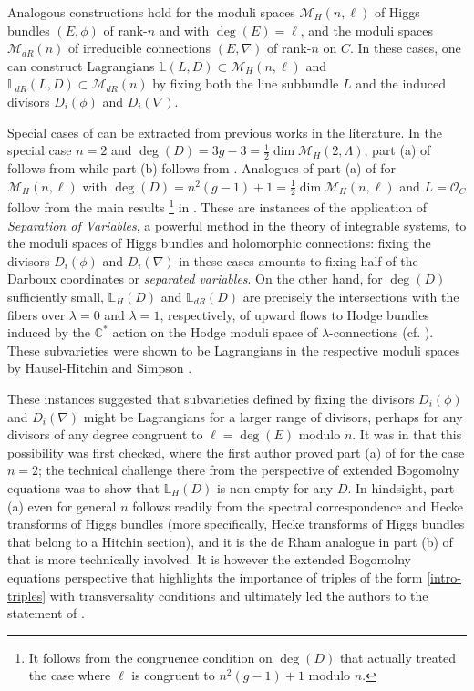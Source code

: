 \documentclass[twoside, 11pt]{article}
\numberwithin{equation}{section}
\theoremstyle{theorem}
\numberwithin{theorem}{section}
\theoremstyle{definition}
\begin{document}
Analogous constructions hold for the moduli spaces $\mathcal{M}_H(n, \ell)$ of Higgs bundles $(E, \phi)$ of rank-$n$ and with $\deg(E) = \ell$, and the moduli spaces $\mathcal{M}_{dR}(n)$ of irreducible connections $(E, \nabla)$ of rank-$n$ on $C$. In these cases, one can construct Lagrangians $\mathbb{L}(L, D) \subset \mathcal{M}_H(n, \ell)$ and $\mathbb{L}_{dR}(L, D) \subset \mathcal{M}_{dR}(n)$ by fixing both the line subbundle $L$ and the induced divisors $D_i(\phi)$ and $D_i(\nabla)$.

Special cases of  can be extracted from previous works in the literature. 
In the special case $n=2$ and $\deg(D) = 3g-3 = \frac{1}{2} \dim \mathcal{M}_H(2, \Lambda)$, part (a) of  follows from \cite{DT23} while part (b) follows from \cite{iwasaki92, pinchbeck, D24-lambda}. 
Analogues of part (a) of  for $\mathcal{M}_H(n, \ell)$ with $\deg(D) = n^2(g-1) + 1 = \frac{1}{2} \dim \mathcal{M}_H(n, \ell)$ and $L = \mathcal{O}_C$ follow from the main results 
\footnote{It follows from the congruence condition on $\deg(D)$ that \cite{GNR01} actually treated the case where $\ell$ is congruent to $n^2(g-1) + 1$ modulo $n$.}
in \cite{GNR01}. 
These are instances of the application of \textit{Separation of Variables},
a powerful method in the theory of integrable systems, 
to the moduli spaces of Higgs bundles and holomorphic connections:
fixing the divisors $D_i(\phi)$ and $D_i(\nabla)$ in these cases amounts to fixing half of the Darboux coordinates or \textit{separated variables}.
On the other hand, for $\deg(D)$ sufficiently small,  
$\mathbb{L}_H(D)$ and $\mathbb{L}_{dR}(D)$ are precisely the intersections with the fibers over $\lambda = 0$ and $\lambda = 1$, respectively, of upward flows to Hodge bundles induced by the $\mathbb{C}^\ast$ action on the Hodge moduli space of $\lambda$-connections (cf. ). 
These subvarieties were shown to be Lagrangians in the respective moduli spaces by Hausel-Hitchin \cite{HH22} and Simpson \cite{Simpson08}. 

These instances suggested that subvarieties defined by fixing the divisors $D_i(\phi)$ and $D_i(\nabla)$ might be Lagrangians for a larger range of divisors, perhaps for any divisors of any degree congruent to $\ell = \deg(E)$ modulo $n$.
It was in \cite{Dim24} that this possibility was first checked, 
where the first author proved part (a) of  for the case $n = 2$;
the technical challenge there from the perspective of extended Bogomolny equations was to show that $\mathbb{L}_H(D)$ is non-empty for any $D$. 
In hindsight, part (a) even for general $n$ follows readily from the spectral correspondence and Hecke transforms of Higgs bundles (more specifically, Hecke transforms of Higgs bundles that belong to a Hitchin section), and it is the de Rham analogue in part (b) of  that is more technically involved. It is however the extended Bogomolny equations perspective that highlights the importance of triples of the form \eqref{intro-triples} with transversality conditions and ultimately led the authors to the statement of .  
\end{document}
